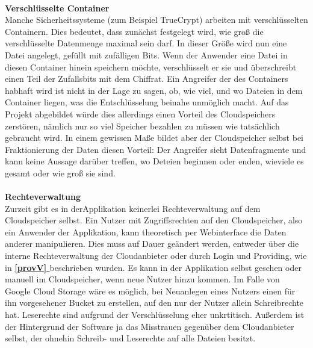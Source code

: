 \documentclass[13pt,a4paper,bibliography=totocnumbered,listof=totocnumbered]{scrartcl}
\newcommand*{\fullref}[1]{\textbf{\hyperref[{#1}]{\ref*{#1} \nameref*{#1}}}}
\begin{document}
\\\textbf{Verschlüsselte Container}\\
Manche Sicherheitssysteme (zum Beispiel TrueCrypt) arbeiten mit verschlüsselten Containern. Dies bedeutet, dass zunächst festgelegt wird, wie groß die verschlüsselte Datenmenge maximal sein darf. In dieser Größe wird nun eine Datei angelegt, gefüllt mit zufälligen Bits. Wenn der Anwender eine Datei in diesen Container hinein speichern möchte, verschlüsselt er sie und überschreibt einen Teil der Zufallsbits mit dem Chiffrat. Ein Angreifer der des Containers habhaft wird ist nicht in der Lage zu sagen, ob, wie viel, und wo Dateien in dem Container liegen, was die Entschlüsselung beinahe unmöglich macht. Auf das Projekt abgebildet würde dies allerdings einen Vorteil des Cloudspeichers zerstören, nämlich nur so viel Speicher bezahlen zu müssen wie tatsächlich gebraucht wird. In einem gewissen Maße bildet aber der Cloudspeicher selbst bei Fraktionierung der Daten diesen Vorteil: Der Angreifer sieht Datenfragmente und kann keine Aussage darüber treffen, wo Deteien beginnen oder enden, wieviele es gesamt oder wie groß sie sind.\\
\\\textbf{Rechteverwaltung}\\
Zurzeit gibt es in derApplikation keinerlei Rechteverwaltung auf dem Cloudspeicher selbst. Ein Nutzer mit Zugriffsrechten auf den Cloudspeicher, also ein Anwender der Applikation, kann theoretisch per Webinterface die Daten anderer manipulieren. Dies muss auf Dauer geändert werden, entweder über die interne Rechteverwaltung der Cloudanbieter oder durch Login und Providing, wie in \fullref{provV} beschrieben wurden. Es kann in der Applikation selbst geschen oder manuell im Cloudspeicher, wenn neue Nutzer hinzu kommen. Im Falle von Google Cloud Storage wäre es möglich, bei Neuanlegen eines Nutzers einen für ihn vorgesehener Bucket zu erstellen, auf den nur der Nutzer allein Schreibrechte hat. Leserechte sind aufgrund der Verschlüsselung eher unkrtitisch. Außerdem ist der Hintergrund der Software ja das Misstrauen gegenüber dem Cloudanbieter selbst, der ohnehin Schreib- und Leserechte auf alle Dateien besitzt.
\pagebreak


	
{\raggedright 

 
 
 \nocite{41}
 \nocite{42}
 \nocite{43}
 \nocite{44}
}
\pagebreak
\end{document}

